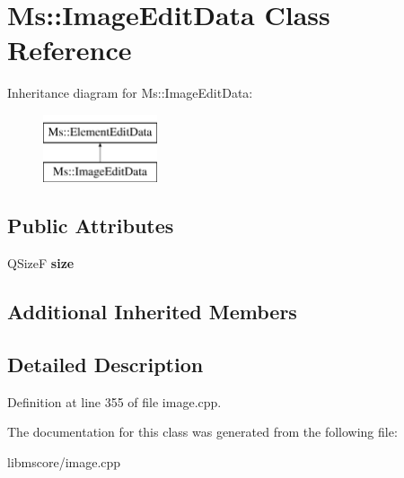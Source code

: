 \hypertarget{class_ms_1_1_image_edit_data}{}\section{Ms\+:\+:Image\+Edit\+Data Class Reference}
\label{class_ms_1_1_image_edit_data}
Inheritance diagram for Ms\+:\+:Image\+Edit\+Data\+:\begin{figure}[H]
\begin{center}
\leavevmode
\includegraphics[height=2.000000cm]{class_ms_1_1_image_edit_data}
\end{center}
\end{figure}
\subsection*{Public Attributes}
\begin{DoxyCompactItemize}
\item 
\mbox{\label{class_ms_1_1_image_edit_data_a3f4af23c64813a1b3d828e162059ea7d}} 
Q\+SizeF {\bfseries size}
\end{DoxyCompactItemize}
\subsection*{Additional Inherited Members}


\subsection{Detailed Description}


Definition at line 355 of file image.\+cpp.



The documentation for this class was generated from the following file\+:\begin{DoxyCompactItemize}
\item 
libmscore/image.\+cpp\end{DoxyCompactItemize}
